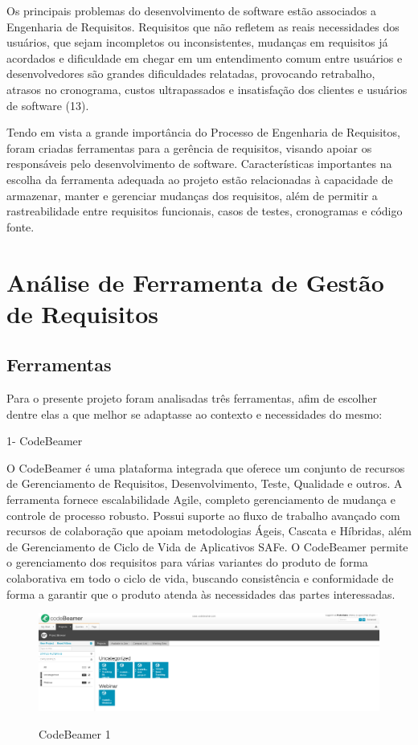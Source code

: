 Os principais problemas do desenvolvimento de software estão associados a Engenharia de Requisitos. Requisitos que não refletem as reais necessidades dos usuários, que sejam incompletos ou inconsistentes, mudanças em requisitos já acordados e dificuldade em chegar em um entendimento comum entre usuários e desenvolvedores são grandes dificuldades relatadas, provocando retrabalho, atrasos no cronograma, custos ultrapassados e insatisfação dos clientes e usuários de software (13).

Tendo em vista a grande importância do Processo de Engenharia de Requisitos, foram criadas ferramentas para a gerência de requisitos, visando apoiar os responsáveis pelo desenvolvimento de software. Características importantes na escolha da ferramenta adequada ao projeto estão relacionadas à capacidade de  armazenar, manter e gerenciar mudanças dos requisitos, além de permitir a rastreabilidade entre requisitos funcionais, casos de testes, cronogramas e código fonte.


\section {Análise de Ferramenta de Gestão de Requisitos}

\subsection{Ferramentas}

Para o presente projeto foram analisadas três ferramentas, afim de escolher dentre elas a que melhor se adaptasse ao contexto e necessidades do mesmo:

1- CodeBeamer

O CodeBeamer é uma plataforma integrada que oferece um conjunto de recursos de Gerenciamento de Requisitos, Desenvolvimento, Teste, Qualidade e outros. A ferramenta fornece escalabilidade Agile, completo gerenciamento de mudança e controle de processo robusto. Possui suporte ao fluxo de trabalho avançado com recursos de colaboração que apoiam metodologias Ágeis, Cascata e Híbridas, além de Gerenciamento de Ciclo de Vida de Aplicativos SAFe. O CodeBeamer permite o gerenciamento dos requisitos para várias variantes do produto de forma colaborativa em todo o ciclo de vida, buscando consistência e conformidade de forma a garantir que o produto atenda às necessidades das partes interessadas.

\FloatBarrier
\begin{figure}[!htpd]
		\centering
		\caption{CodeBeamer 1}
		\includegraphics[scale=0.27]{figuras/Code}
		\label{img:SAF}
\end{figure}
\FloatBarrier


